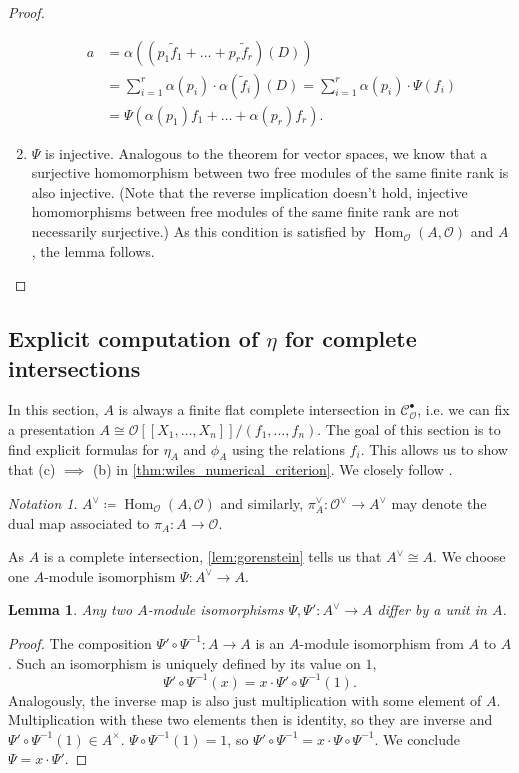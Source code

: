 \documentclass{article}
\theoremstyle{plain}%
\newtheorem{lemma}[theorem]{Lemma}
\theoremstyle{definition}
\theoremstyle{remark}
\newtheorem*{notation}{Notation}
\newcommand{\cob}{\mathcal{C}_\mathcal{O}^\bullet}
\renewcommand{\hom}{\operatorname{Hom}}
\begin{document}
\begin{proof}
\begin{enumerate}
        \begin{align*} 
                a &= \alpha((p_1 \tilde f_1 + \dots + p_r \tilde f_r)(D))\\
                &= \sum_{i=1}^r \alpha(p_i)\cdot \alpha(\tilde{f}_i)(D) = \sum_{i=1}^r \alpha(p_i) \cdot \Psi(f_i)\\
                &= \Psi(\alpha(p_1) f_1 + \dots + \alpha(p_r) f_r).
        \end{align*}
        \item \(\Psi\) is injective.
        Analogous to the theorem for vector spaces, we know that a surjective homomorphism between two free modules 
        of the same finite rank is also injective.
        (Note that the reverse implication doesn't hold, injective homomorphisms between free modules of the same
        finite rank are not necessarily surjective.)
        As this condition is satisfied by \(\hom_\mathcal{O}(A, \mathcal{O})\) and \(A\), 
        the lemma follows.
    \end{enumerate}
\end{proof}

\subsection{Explicit computation of \texorpdfstring{\(\eta\)}{η} for complete intersections}

In this section, \(A\) is always a finite flat complete intersection in \(\cob\), 
i.e. we can fix a presentation \(A \cong \mathcal{O}[[X_1, \dots, X_n]]/(f_1, \dots, f_n)\).
The goal of this section is to find explicit formulas for \(\eta_A\) and \(\phi_A\) using
the relations \(f_i\). This allows us to show that (c) \(\implies\) (b) in \cref{thm:wiles_numerical_criterion}.
We closely follow \cite[chapter 5.4]{Darmon1995}.
\begin{notation}
    \(A^\vee \coloneqq \hom_\mathcal{O}(A, \mathcal{O})\) and similarly, \(\pi_A^\vee \colon \mathcal{O}^\vee \to A^\vee\) 
    may denote the dual map associated to \(\pi_A\colon A \to \mathcal{O}\).
\end{notation}
As \(A\) is a complete intersection, \cref{lem:gorenstein} tells us that \(A^\vee \cong A\).
We choose one \(A\)-module isomorphism \(\Psi\colon A^\vee \to A\).
\begin{lemma}
    Any two \(A\)-module isomorphisms \(\Psi, \Psi' \colon A^\vee \to A\) differ by a unit in \(A\).
\end{lemma}
\begin{proof}
    The composition \(\Psi' \circ \Psi^{-1} \colon A \to A\) is an \(A\)-module isomorphism from \(A\) to \(A\).
    Such an isomorphism is uniquely defined by its value on \(1\),
    \[
        \Psi' \circ \Psi^{-1}(x) = x \cdot \Psi' \circ \Psi^{-1}(1).
    \]
    Analogously, the inverse map is also just multiplication with some element of \(A\).
    Multiplication with these two elements then is identity, so they are inverse and
    \(\Psi' \circ \Psi^{-1}(1) \in A^\times\).
    \(\Psi \circ \Psi^{-1}(1) = 1\), so \(\Psi' \circ \Psi^{-1} = x \cdot \Psi \circ \Psi^{-1}\).
    We conclude \(\Psi = x \cdot \Psi'\).
\end{proof}
\end{document}
